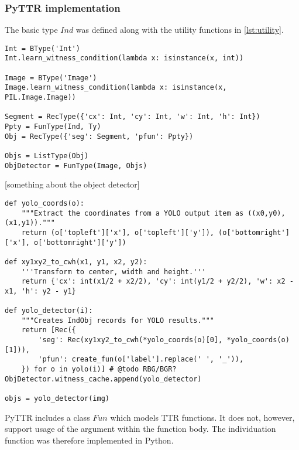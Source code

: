 \subsubsection{PyTTR implementation}

The basic type $Ind$ was defined along with the utility functions in \autoref{lst:utility}.

\begin{lstlisting}[label={lst:pyttrbasic},caption={individuate()}]
Int = BType('Int')
Int.learn_witness_condition(lambda x: isinstance(x, int))

Image = BType('Image')
Image.learn_witness_condition(lambda x: isinstance(x, PIL.Image.Image))

Segment = RecType({'cx': Int, 'cy': Int, 'w': Int, 'h': Int})
Ppty = FunType(Ind, Ty)
Obj = RecType({'seg': Segment, 'pfun': Ppty})

Objs = ListType(Obj)
ObjDetector = FunType(Image, Objs)
\end{lstlisting}

[something about the object detector]

\begin{lstlisting}[label=lst:pyttr_yolo, caption=Connecting YOLO output to PyTTR]
def yolo_coords(o):
    """Extract the coordinates from a YOLO output item as ((x0,y0), (x1,y1))."""
    return (o['topleft']['x'], o['topleft']['y']), (o['bottomright']['x'], o['bottomright']['y'])

def xy1xy2_to_cwh(x1, y1, x2, y2):
    '''Transform to center, width and height.'''
    return {'cx': int(x1/2 + x2/2), 'cy': int(y1/2 + y2/2), 'w': x2 - x1, 'h': y2 - y1}

def yolo_detector(i):
    """Creates IndObj records for YOLO results."""
    return [Rec({
        'seg': Rec(xy1xy2_to_cwh(*yolo_coords(o)[0], *yolo_coords(o)[1])),
        'pfun': create_fun(o['label'].replace(' ', '_')),
    }) for o in yolo(i)] # @todo RBG/BGR?
ObjDetector.witness_cache.append(yolo_detector)

objs = yolo_detector(img)
\end{lstlisting}

PyTTR includes a class $Fun$ which models TTR functions.
It does not, however, support usage of the argument within the function body.
The individuation function was therefore implemented in Python.

